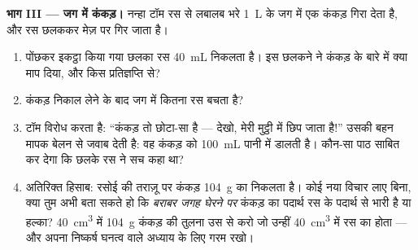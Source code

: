 \begin{problem}[{सप्ताहांत समस्या --- बग़ीचे में रस निकालने का दिन;
लीटरों से बोतलों तक, पेटियों से तराज़ू तक; और जग में गिरा कंकड़}]
\medskip\noindent\textbf{भाग III --- जग में कंकड़।}
नन्हा टॉम रस से लबालब भरे \qty{1}{L} के जग में एक कंकड़ गिरा देता है,
और रस छलककर मेज़ पर गिर जाता है।
\begin{enumerate}[resume]
  \item पोंछकर इकट्ठा किया गया छलका रस \qty{40}{mL} निकलता है। इस
        छलकने ने कंकड़ के बारे में क्या माप दिया, और किस
        प्रतिज्ञप्ति से?
  \item कंकड़ निकाल लेने के बाद जग में कितना रस बचता है?
  \item टॉम विरोध करता है: ``कंकड़ तो छोटा-सा है --- देखो, मेरी
        मुट्ठी में छिप जाता है!'' उसकी बहन मापक बेलन से जवाब देती
        है: वह कंकड़ को \qty{100}{mL} पानी में डालती है। कौन-सा पाठ
        साबित कर देगा कि छलके रस ने सच कहा था?
  \item अतिरिक्त हिसाब: रसोई की तराज़ू पर कंकड़ \qty{104}{g} का
        निकलता है। कोई नया विचार लाए बिना, क्या तुम अभी बता सकते हो
        कि \emph{बराबर जगह घेरने पर} कंकड़ का पदार्थ रस के पदार्थ से
        भारी है या हल्का? \qty{40}{cm^3} में \qty{104}{g} कंकड़ की
        तुलना उस  से करो जो उन्हीं \qty{40}{cm^3} में रस का
        होता --- और अपना निष्कर्ष घनत्व वाले अध्याय के लिए गरम रखो।
\end{enumerate}
\end{problem}
